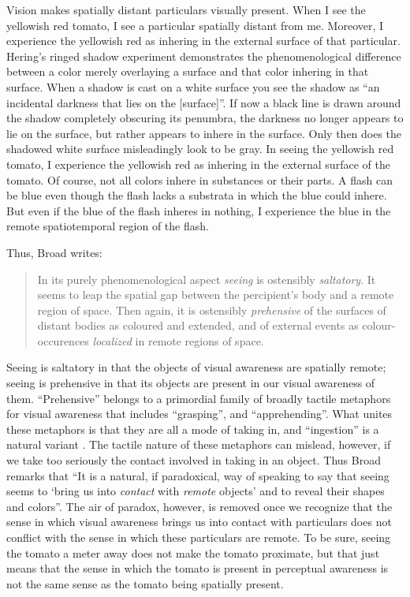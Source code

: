 \documentclass[12pt]{article}
\begin{document}
Vision makes spatially distant particulars visually present. When I see the yellowish red tomato, I see a particular spatially distant from me. Moreover, I experience the yellowish red as inhering in the external surface of that particular. Hering's \citeyearpar[8]{Hering:1920ty} ringed shadow experiment demonstrates the phenomenological difference between a color merely overlaying a surface and that color inhering in that surface. When a shadow is cast on a white surface you see the shadow as ``an incidental darkness that lies on the [surface]''. If now a black line is drawn around the shadow completely obscuring its penumbra, the darkness no longer appears to lie on the surface, but rather appears to inhere in the surface. Only then does the shadowed white surface misleadingly look to be gray. In seeing the yellowish red tomato, I experience the yellowish red as inhering in the external surface of the tomato. Of course, not all colors inhere in substances or their parts. A flash can be blue even though the flash lacks a substrata in which the blue could inhere. But even if the blue of the flash inheres in nothing, I experience the blue in the remote spatiotemporal region of the flash. 

Thus, Broad writes:
\begin{quote}
    In its purely phenomenological aspect \emph{seeing} is ostensibly \emph{saltatory}. It seems to leap the spatial gap between the percipient's body and a remote region of space. Then again, it is ostensibly \emph{prehensive} of the surfaces of distant bodies as coloured and extended, and of external events as colour-occurences \emph{localized} in remote regions of space. \citep[32]{Broad:1965dq}
\end{quote}
Seeing is saltatory in that the objects of visual awareness are spatially remote; seeing is prehensive in that its objects are present in our visual awareness of them. ``Prehensive'' belongs to a primordial family of broadly tactile metaphors for visual awareness that includes ``grasping'', and ``apprehending''. What unites these metaphors is that they are all a mode of taking in, and ``ingestion'' is a natural variant \citep[see][]{Johnston:2006uq}. The tactile nature of these metaphors can mislead, however, if we take too seriously the contact involved in taking in an object. Thus Broad remarks that ``It is a natural, if paradoxical, way of speaking to say that seeing seems to `bring us into \emph{contact} with \emph{remote} objects' and to reveal their shapes and colors''. The air of paradox, however, is removed once we recognize that the sense in which visual awareness brings us into contact with particulars does not conflict with the sense in which these particulars are remote. To be sure, seeing the tomato a meter away does not make the tomato proximate, but that just means that the sense in which the tomato is present in perceptual awareness is not the same sense as the tomato being spatially present.
\end{document}
